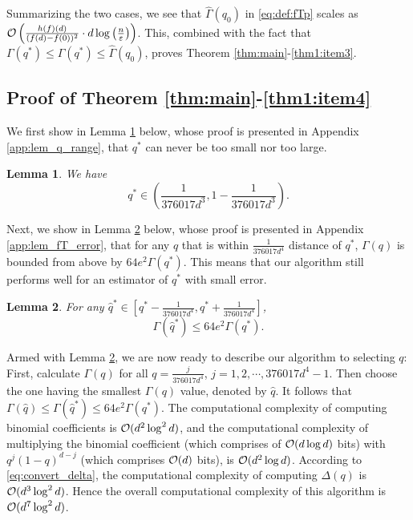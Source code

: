 \documentclass[onecolumn,letterpaper]{IEEEtran}
\newtheorem{lemma}{Lemma}
\newcommand{\cO}{{\cal O}}
\newcommand{\cp}{{q}}
\newcommand{\pgap}{{\Delta(\cp)}}
\newcommand{\cpn}{{\cp^*}}
\newcommand{\fh}{{h(f)}}
\newcommand{\ftau}{{\Gamma}}
\newcommand{\ftaup}{{\hat{\Gamma}}}
\newcommand{\fT}{{\ftau(\cp)}}
\newcommand{\fTn}{\ftau (\cpn)}
\newcommand{\fTpn}{\ftaup (\cpn)}
\newcommand{\cpns}{\cp_0}
\newcommand{\fTpns}{\ftaup (\cpns)}
\newcommand{\cph}{{\hat{\cp}^*}}
\newcommand{\cphglobal}{{\hat{\cp}}}
\newcommand{\fTh}{{\Gamma(\cph)}}
\newcommand{\fThglobal}{{\Gamma(\cphglobal)}}
\begin{document}
Summarizing the two cases, we see that $\fTpns$ in \eqref{eq:def:fTp} scales as
 $  \cO \left( \frac{\fh(d)}{(f(d)-f(0))^2} \cdot d \log \left(\frac{n}{\varepsilon}\right) \right)$.
This, combined with the fact that $\fTn \le \fTpn \le \fTpns $, proves Theorem \ref{thm:main}-\ref{thm1:item3}.

\fi%
\subsection{Proof of Theorem \ref{thm:main}-\ref{thm1:item4}} \label{sec:proof_thm_1_4}

We first show in Lemma \ref{lem:q_range} below, whose proof is presented in Appendix \ref{app:lem_q_range}, that $\cpn$ can never be too small nor too large.
\begin{lemma} \label{lem:q_range}
We have
\begin{equation}
    \cpn \in \left( \frac{1}{376017d^3} , 1-\frac{1}{376017d^3}\right).
\end{equation}
\end{lemma}


Next, we show in Lemma \ref{lem:fT_error} below, whose proof is presented in Appendix \ref{app:lem_fT_error}, that for any $\cp$ that is within $\frac{1}{376017d^4}$ distance of $\cpn$, $\fT$ is bounded from above  by $64e^2 \fTn$. This means that our algorithm still performs well for an estimator of $\cpn$ with small error. 
\begin{lemma} \label{lem:fT_error}
For any $\cph \in \left[ \cpn-\frac{1}{376017d^4} , \cpn+\frac{1}{376017d^4} \right]$, 
\begin{equation}
    \fTh \le 64e^2 \fTn.
\end{equation}
\end{lemma}

Armed with Lemma \ref{lem:fT_error}, we are now ready to describe our algorithm to selecting $\cp$: First, calculate $\fT$ for all $\cp = \frac{j}{376017 d^4}$, $j = 1,2,\cdots, 376017d^4 - 1$. Then choose the one having the smallest $\fT$ value, denoted by $\cphglobal$. It follows that $\fThglobal \le \fTh \le 64e^2\fTn$. The computational complexity of computing binomial coefficients is $\cO(d^2 \log^2 d)$, and the computational complexity of multiplying the binomial coefficient (which comprises of $\cO(d \log d)$ bits) with $\cp^j (1-\cp)^{d-j}$ (which comprises  $\cO(d)$ bits), is $\cO(d^2 \log d)$. According to \eqref{eq:convert_delta}, the computational complexity of computing $\pgap$ is $\cO(d^3 \log^2 d)$. Hence the overall computational complexity of this algorithm is $\cO (d^7 \log^2d)$.
\end{document}

